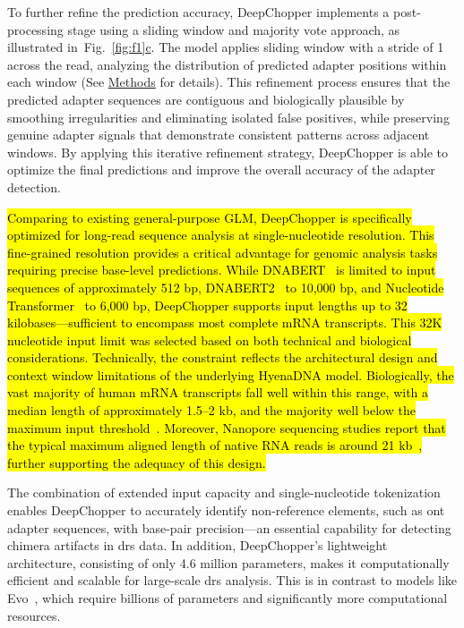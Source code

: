\documentclass[pdflatex,sn-nature, lineno]{sn-jnl}%
\newcommand{\figref}[2]{Fig.~\hyperref[#1]{\ref*{#1}#2}}
\begin{document}
To further refine the prediction accuracy, DeepChopper implements a post-processing stage using a sliding window and majority vote approach, as illustrated in~\figref{fig:f1}{c}.
The model applies sliding window with a stride of 1 across the read, analyzing the distribution of predicted adapter positions within each window (See \hyperref[sec:methods]{Methods} for details).
This refinement process ensures that the predicted adapter sequences are contiguous and biologically plausible by smoothing irregularities and eliminating isolated false positives, while preserving genuine adapter signals that demonstrate consistent patterns across adjacent windows.
By applying this iterative refinement strategy, DeepChopper is able to optimize the final predictions and improve the overall accuracy of the adapter detection.

\hl{Comparing to existing general-purpose GLM, DeepChopper is specifically optimized for long-read sequence analysis at single-nucleotide resolution.
	This fine-grained resolution provides a critical advantage for genomic analysis tasks requiring precise base-level predictions.
	While DNABERT\mbox{~\cite{ji2021dnabert}} is limited to input sequences of approximately 512 bp, DNABERT2\mbox{~\cite{zhou2023dnabert2}} to 10,000 bp, and Nucleotide Transformer\mbox{~\cite{dalla2024nucleotide}} to 6,000 bp, DeepChopper supports input lengths up to 32 kilobases—sufficient to encompass most complete mRNA transcripts.
	This 32K nucleotide input limit was selected based on both technical and biological considerations. Technically, the constraint reflects the architectural design and context window limitations of the underlying HyenaDNA model.
	Biologically, the vast majority of human mRNA transcripts fall well within this range, with a median length of approximately 1.5–2 kb, and the majority well below the maximum input threshold\mbox{~\cite{lopes2021gene}}.
	Moreover, Nanopore sequencing studies report that the typical maximum aligned length of native RNA reads is around 21 kb\mbox{~\cite{workman2019nanopore}}, further supporting the adequacy of this design.}

The combination of extended input capacity and single-nucleotide tokenization enables DeepChopper to accurately identify non-reference elements, such as \gls{ont} adapter sequences, with base-pair precision—an essential capability for detecting chimera artifacts in \gls{drs} data.
In addition, DeepChopper’s lightweight architecture, consisting of only 4.6 million parameters, makes it computationally efficient and scalable for large-scale \gls{drs} analysis.
This is in contrast to models like Evo\mbox{~\cite{nguyen2024sequence}}, which require billions of parameters and significantly more computational resources.
\end{document}
